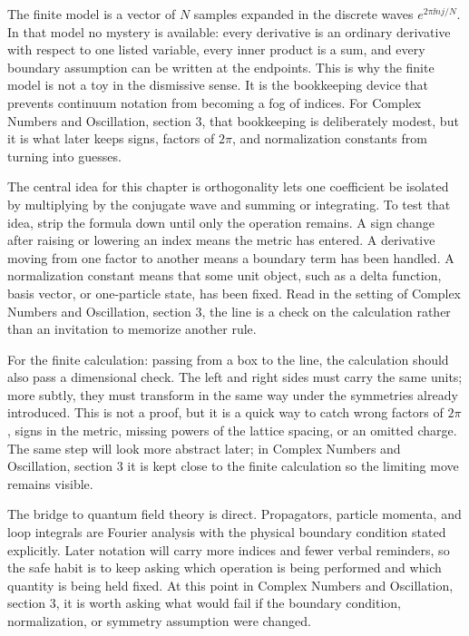 The finite model is a vector of \(N\) samples expanded in the discrete waves \(e^{2\pi \ii nj/N}\).  In that model no mystery is available: every derivative is an ordinary derivative with respect to one listed variable, every inner product is a sum, and every boundary assumption can be written at the endpoints.  This is why the finite model is not a toy in the dismissive sense.  It is the bookkeeping device that prevents continuum notation from becoming a fog of indices.  For Complex Numbers and Oscillation, section 3, that bookkeeping is deliberately modest, but it is what later keeps signs, factors of \(2\pi\), and normalization constants from turning into guesses.

The central idea for this chapter is orthogonality lets one coefficient be isolated by multiplying by the conjugate wave and summing or integrating.  To test that idea, strip the formula down until only the operation remains.  A sign change after raising or lowering an index means the metric has entered.  A derivative moving from one factor to another means a boundary term has been handled.  A normalization constant means that some unit object, such as a delta function, basis vector, or one-particle state, has been fixed.  Read in the setting of Complex Numbers and Oscillation, section 3, the line is a check on the calculation rather than an invitation to memorize another rule.

For the finite calculation: passing from a box to the line, the calculation should also pass a dimensional check.  The left and right sides must carry the same units; more subtly, they must transform in the same way under the symmetries already introduced.  This is not a proof, but it is a quick way to catch wrong factors of \(2\pi\), signs in the metric, missing powers of the lattice spacing, or an omitted charge.  The same step will look more abstract later; in Complex Numbers and Oscillation, section 3 it is kept close to the finite calculation so the limiting move remains visible.

The bridge to quantum field theory is direct.  Propagators, particle momenta, and loop integrals are Fourier analysis with the physical boundary condition stated explicitly.  Later notation will carry more indices and fewer verbal reminders, so the safe habit is to keep asking which operation is being performed and which quantity is being held fixed.  At this point in Complex Numbers and Oscillation, section 3, it is worth asking what would fail if the boundary condition, normalization, or symmetry assumption were changed.

